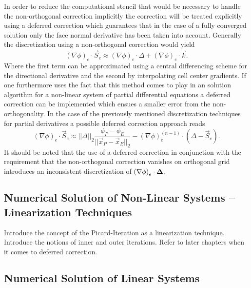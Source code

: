       In order to reduce the computational stencil that would be necessary to handle the non-orthogonal correction implicitly the correction will be treated explicitly using a deferred correction which guarantees that in the case of a fully converged solution only the face normal derivative has been taken into account. Generally the discretization using a non-orthogonal correction would yield 
      \begin{displaymath}
        \left( \nabla \phi \right)_e \cdot \vec{S}_e \approx \left(\nabla \phi \right)_e \cdot \Delta + \left( \nabla \phi \right)_e \cdot \vec{k}.
      \end{displaymath}
      Where the first term can be approximated using a central differencing scheme for the directional derivative and the second by interpolating cell center gradients. If one furthermore uses the fact that this method comes to play in an solution algorithm for a non-linear system of partial differential equations a deferred correction can be implemented which ensues a smaller error from the non-orthogonality. In the case of the previously mentioned discretization techniques for partial derivatives a possible deferred correction approach reads
      \begin{displaymath}
        \left( \nabla \phi \right)_e \cdot \vec{S}_e \approx ||\Delta||_2 \frac{\phi_P - \phi_E}{||\vec{x}_P - \vec{x}_E||_2} - \left(\nabla \phi \right)_e^{(n-1)} \cdot \left(\Delta - \vec{S}_e \right).
      \end{displaymath}
      It should be noted that the use of a deferred correction in conjunction with the requirement that the non-orthogonal correction vanishes on orthogonal grid introduces an inconsistent discretization of \( \left(\nabla \phi \right)_e \cdot \boldsymbol{\Delta} \).

    \subsection{Numerical Solution of Non-Linear Systems -- Linearization Techniques}
    \label{sec:nonlinear}

      Introduce the concept of the Picard-Iteration as a linearization technique. Introduce the notions of inner and outer iterations. Refer to later chapters when it comes to deferred correction.

    \subsection{Numerical Solution of Linear Systems}

